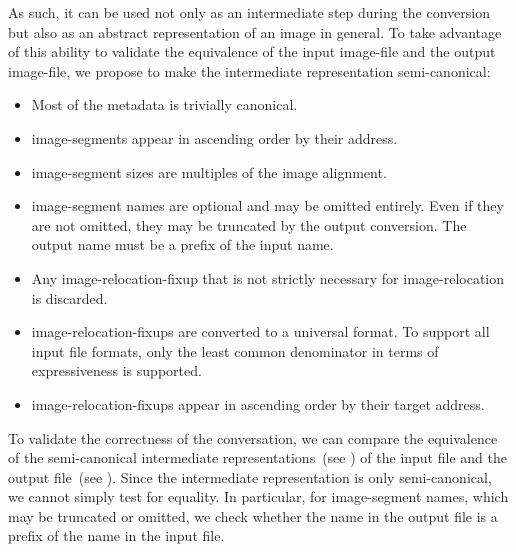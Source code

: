 As such, it can be used not only as an intermediate step during the conversion but also as an abstract representation of an \gls{image} in general. To take advantage of this ability to validate the equivalence of the input \gls{image-file} and the output \gls{image-file}, we propose to make the intermediate representation semi-canonical:
\begin{itemize}
  \item Most of the metadata is trivially canonical.
  \item \Glspl{image-segment} appear in ascending order by their address.
  \item \Gls{image-segment} sizes are multiples of the \gls{image} alignment.
  \item \Gls{image-segment} names are optional and may be omitted entirely. Even if they are not omitted, they may be truncated by the output conversion. The output name must be a prefix of the input name.
  \item Any \gls{image-relocation-fixup} that is not strictly necessary for \gls{image-relocation} is discarded.
  \item \Glspl{image-relocation-fixup} are converted to a universal format. To support all input file formats, only the least common denominator in terms of expressiveness is supported.
  \item \Glspl{image-relocation-fixup} appear in ascending order by their target address.
\end{itemize}

To validate the correctness of the conversation, we can compare the equivalence of the semi-canonical intermediate representations~(see ) of the input file and the output file~(see ). Since the intermediate representation is only semi-canonical, we cannot simply test for equality. In particular, for \gls{image-segment} names, which may be truncated or omitted, we check whether the name in the output file is a prefix of the name in the input file.

